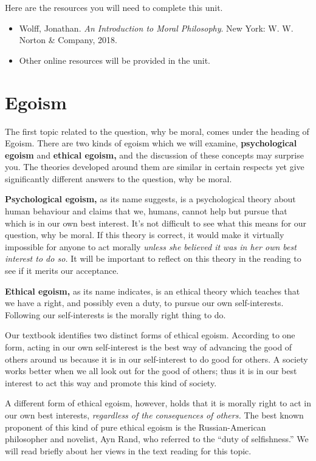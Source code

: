 \documentclass[
]{book}
\providecommand{\tightlist}{%
  \setlength{\itemsep}{0pt}\setlength{\parskip}{0pt}}
\begin{document}
Here are the resources you will need to complete this unit.

\begin{itemize}
\tightlist
\item
  Wolff, Jonathan. \emph{An Introduction to Moral Philosophy}. New York: W. W. Norton \& Company, 2018.
\item
  Other online resources will be provided in the unit.
\end{itemize}

\hypertarget{egoism}{%
\section{Egoism}\label{egoism}}

The first topic related to the question, why be moral, comes under the heading of Egoism. There are two kinds of egoism which we will examine, \textbf{psychological egoism} and \textbf{ethical egoism,} and the discussion of these concepts may surprise you. The theories developed around them are similar in certain respects yet give significantly different answers to the question, why be moral.

\textbf{Psychological egoism,} as its name suggests, is a psychological theory about human behaviour and claims that we, humans, cannot help but pursue that which is in our own best interest. It's not difficult to see what this means for our question, why be moral. If this theory is correct, it would make it virtually impossible for anyone to act morally \emph{unless she believed it was in her own best interest to do so.} It will be important to reflect on this theory in the reading to see if it merits our acceptance.

\textbf{Ethical egoism,} as its name indicates, is an ethical theory which teaches that we have a right, and possibly even a duty, to pursue our own self-interests. Following our self-interests is the morally right thing to do.

Our textbook identifies two distinct forms of ethical egoism. According to one form, acting in our own self-interest is the best way of advancing the good of others around us because it is in our self-interest to do good for others. A society works better when we all look out for the good of others; thus it is in our best interest to act this way and promote this kind of society.

A different form of ethical egoism, however, holds that it is morally right to act in our own best interests, \emph{regardless of the consequences of others.} The best known proponent of this kind of pure ethical egoism is the Russian-American philosopher and novelist, Ayn Rand, who referred to the ``duty of selfishness.'' We will read briefly about her views in the text reading for this topic.
\end{document}
